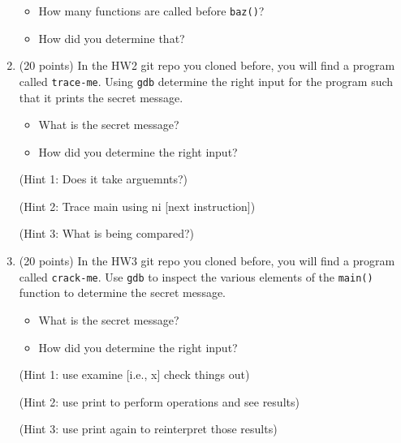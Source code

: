 \documentclass{article}[9pt]
\begin{document}
\begin{enumerate}
\begin{itemize}
\item How many functions are called before \texttt{baz()}?
\item How did you determine that?
\end{itemize}

\item (20 points) In the HW2 git repo you cloned before, you will find a program
called \texttt{trace-me}. Using \texttt{gdb} determine the right input for
the program such that it prints the secret message.

\begin{itemize}
\item What is the secret message?
\item How did you determine the right input?
\end{itemize}

(Hint 1: Does it take arguemnts?)

(Hint 2: Trace main using ni [next instruction])

(Hint 3: What is being compared?)

\item (20 points) In the HW3 git repo you cloned before, you will find a program
called \texttt{crack-me}. Use \texttt{gdb} to inspect the various elements of
the \texttt{main()} function to determine the secret message.

\begin{itemize}
\item What is the secret message?
\item How did you determine the right input?
\end{itemize}

(Hint 1: use examine [i.e., x] check things out)

(Hint 2: use print to perform operations and see results)

(Hint 3: use print again to reinterpret those results)
\end{enumerate}
\end{document}
